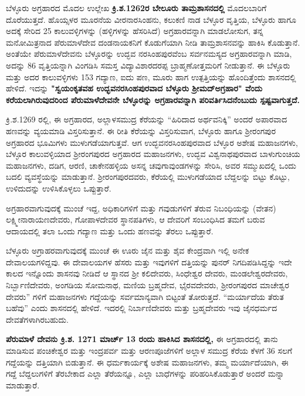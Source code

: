 ಬೆಳ್ಳೂರು ಅಗ್ರಹಾರದ ಮೊದಲ ಉಲ್ಲೇಖ \textbf{ಕ್ರಿ.ಶ.1262ರ ಬೇಲೂರು ತಾಮ್ರಶಾಸನದಲ್ಲಿ} ಮೊದಲಬಾರಿಗೆ ದೊರೆಯುತ್ತದೆ. ಹೊಯ್ಸಳರ ಮೂರನೆಯ ವೀರನಾರಸಿಂಹನು, ಕಲುಕಣಿ ನಾಡ ಬೆಳ್ಳೂರ ವೃತ್ತಿಯ, ಬೆಳ್ಳೂರು ಹಾಗೂ ಅದಕ್ಕೆ ಸೇರಿದ 25 ಕಾಲುವಳ್ಳಿಗಳನ್ನು (ಹಳ್ಳಿಗಳನ್ನು ಹೆಸರಿಸಿದೆ) ಅಗ್ರಹಾರವನ್ನಾಗಿ ಮಾಡಲೋಸುಗ, ತನ್ನ ಮನೋಮಿತ್ರನಾದ ಪೆರುಮಾಳೆದೇವ ದಂಡನಾಯಕನಿಗೆ ಕೊಡುಗೆಯಾಗಿ ನೀಡಿ ತಾಮ್ರಶಾಸನವನ್ನು ಹಾಕಿಸಿ ಕೊಡುತ್ತಾನೆ. ಅಂತೆಯೇ ಪೆರುಮಾಳೆದೇವನು ಬೆಳ್ಳೂರನ್ನು ಉದ್ಭವ ನರಸಿಂಹಪುರವೆಂಬ ಸರ್ವನಮಸ್ಯದ ಅಗ್ರಹಾರವನ್ನಾಗಿ ಮಾಡಿ, ಅದನ್ನು 86 ವೃತ್ತಿಯನ್ನಾಗಿ ವಿಂಗಡಿಸಿ ಸಮಸ್ತ ವಿದ್ಯಾವಿಶಾರದರಪ್ಪ ಬ್ರಾಹ್ಮಣೋತ್ತಮರಿಗೆ ನೀಡುತ್ತಾನೆ. ಈ ಬೆಳ್ಳೂರು ಮತ್ತು ಅದರ ಕಾಲುವಳ್ಳಿಗಳು 153 ಗದ್ಯಾಣ, ಐದು ಪಣ, ಮೂರು ಹಾಗ ಉತ್ಪತ್ತಿಯನ್ನು ಹೊಂದಿತ್ತೆಂದು ಶಾಸನದಲ್ಲಿ ಹೇಳಿದೆ. ಇದನ್ನು \textbf{"ಸ್ವಯಂಕೃತವಹ ಉದ್ಭವನರಸಿಂಹಪುರವಾದ ಬೆಳ್ಳೂರು ಶ‍್ರೀಮದ್​ಅಗ್ರಹಾರ" ವೆಂದು ಕರೆಯಲಾಗಿರುವುದರಿಂದ ಪೆರುಮಾಳೆದೇವನೇ ಬೆಳ್ಳೂರನ್ನು ಅಗ್ರಹಾರವನ್ನಾಗಿ ಪರಿವರ್ತಿಸಿದನೆಂಬುದು ಸ್ಪಷ್ಟವಾಗುತ್ತದೆ.}

ಕ್ರಿ.ಶ.1269 ರಲ್ಲಿ, ಈ ಅಗ್ರಹಾರದ, ಅಲ್ಲಾಳಸಮುದ್ರ ಕೆರೆಯನ್ನು “ಹಿರಿದಾದ ಅರ್ಥವನಿಕ್ಕಿ” ಅಂದರೆ ಅಪಾರವಾದ ಹಣವನ್ನು ವ್ಯಯಮಾಡಿ ವಿಸ್ತರಿಸುತ್ತಾನೆ. ಈ ರೀತಿ ಕೆರೆಯನ್ನು ವಿಸ್ತರಿಸುವಾಗ, ಬೆಳ್ಳೂರು ಹಾಗೂ ಶ‍್ರೀರಂಗಪುರ ಅಗ್ರಹಾರದ ಭೂಮಿಗಳು ಮುಳುಗಡೆಯಾಗುತ್ತವೆ. ಆಗ ಉದ್ಭವನರಸಿಂಹಪುರವಾದ ಬೆಳ್ಳೂರ ಅಶೇಷ ಮಹಾಜನಗಳು, ಬೆಳ್ಳೂರ ಕಾಲುವಳ್ಳಿಯಾದ ಶ‍್ರೀರಂಗಪುರದ ಅಗ್ರಹಾರದ ಮಹಾಜನಗಳು, ಉದ್ಭವ ವಿಶ್ವನಾಥಪುರವಾದ ಬಾಳುಗುಂಚಿಯ ಮಹಾಜನಗಳು, ದಡಿಗ, ಆರಣಿ, ಚಾಕೇನಹಳ್ಳಿಯ ಅಸನ್ನ ಚವುಗಾವುಂಡಗಳನ್ನು ಸೇರಿಸಿ, ಅವರ ಸಮ್ಮುಖದಲ್ಲಿ ಒಂದು ಬದಲಿ ವ್ಯವಸ್ಥೆಯನ್ನು ಮಾಡುತ್ತಾನೆ. ಶ‍್ರೀರಂಗಪುರದವರು, ಕೆರೆಯಲ್ಲಿ ಮುಳುಗಡೆಯಾದ ಬೆದ್ದಲನ್ನು ಬಿಟ್ಟು ಕೊಟ್ಟು, ಉಳಿದುದನ್ನು ಉಳಿಸಿಕೊಳ್ಳಲು ಒಪ್ಪುತ್ತಾರೆ.

ಅಗ್ರಹಾರವಾಗುವುದಕ್ಕೆ ಮುಂಚೆ ಇದ್ದ, ಅಧಿಕಾರಿಗಳಿಗೆ ಮತ್ತು ಗವುಡುಗಳಿಗೆ ತೆರುವ ನಿಬಂಧಿಯನ್ನು (ವೇತನ) ಲಕ್ಷ್ಮೀನಾರಾಯಣದೇವರು, ಗೋಪಾಳದೇವರ ಸ್ಥಾನಪತಿಗಳು, ಆ ದೇವರಿಗೆ ಸಂಬಂಧಿಸಿದ ತಮಗೆ ಬರುವ ಆದಾಯದಲ್ಲಿ ತಲಾ ಒಂದು ಗದ್ಯಾಣ ಮತ್ತು ಒಂದು ಹಣವನ್ನು ತೆರಲು ಒಪ್ಪುತ್ತಾರೆ.

ಬೆಳ್ಳೂರು ಅಗ್ರಾಹರವಾಗುವುದಕ್ಕೆ ಮುಂಚೆ ಈ ಊರು ಜೈನ ಮತ್ತು ಶೈವ ಕೇಂದ್ರವಾಗಿ ಇಲ್ಲಿ ಅನೇಕ ದೇವಾಲಯಗಳಿದ್ದವು. ಈ ದೇವಾಲಯಗಳ ಹೆಸರು ಮತ್ತು ಇವುಗಳಿಗೆ ದತ್ತಿಯನ್ನು ಪುನರ್​ ನಿಗದಿಪಡಿಸಿದ್ದನ್ನು ಇದೇ ಕಾಲದ ಇನ್ನೊಂದು ಶಾಸನವು ನೀಡಿದೆ ಆ ಸ್ಥಾನದ ಶ‍್ರೀ ಕಲಿದೇವರು, ಸಿಂಧೇಶ್ವರ ದೇವರು, ಮಂಡಲೇಶ್ವರದೇವರು, ನಿರ್ಬ್ಬಾಣಿದೇವರು, ಅಂಗಡಿಯ ಸೋಮನಾಥ, ಮಣಿಯ ಬ್ರಹ್ಮದೇವ, ಭೈರವದೇವರು, ಶ‍್ರೀರಂಗಪುರದ ಮಾಚೇಶ್ವರ ದೇವರು” ಗಳಿಗೆ ಮಹಾಜನಗಳು ಗದ್ದೆಯನ್ನು ಸರ್ವಮಾನ್ಯವಾಗಿ ಬಿಟ್ಟಂತೆ ತೋರುತ್ತದೆ. “ಮರ್ಯಾದೆಯ ತೆರುತ ಬಹೆವು” ಎಂದು ಶಾಸನದಲ್ಲಿ ಹೇಳಿದೆ. ಇದರಲ್ಲಿ ನಿರ್ಬಾಣಿದೇವರು ಮತ್ತು ಬ್ರಹ್ಮದೇವರು ಇವು ಜೈನಧರ್ಮದ ದೇವತೆಗಳಾಗಿರಬಹುದು.

\textbf{ಪೆರುಮಾಳೆ ದೇವನು ಕ್ರಿ.ಶ. 1271 ಮಾರ್ಚ್ 13 ರಂದು ಹಾಕಿಸಿದ ಶಾಸನದಲ್ಲಿ,} ಈ ಅಗ್ರಹಾರದಲ್ಲಿ ತಾನು ಮಾಡಿಸುವ ಪಂಚಿಕೇಶ್ವರ ಮತ್ತು ಇಂದ್ರಪರ್ವ ಮತ್ತು ಆರಣಪೂಜೆಗಳಿಗೆ ಅಲ್ಲಾಳ ಸಮುದ್ರ ಕೆರೆಯ ಕೆಳಗೆ 36 ಸಲಗೆ ಗದ್ದೆಯನ್ನು ದತ್ತಿಯಾಗಿ ಬಿಡುತ್ತಾನೆ. ಈ ಧರ್ಮಕಾರ್ಯಕ್ಕೆ ಅಶೇಷ ಮಹಾಜನಗಳು, ತಮ್ಮ ಮರ್ಯಾದೆಯಾಗಿ, ಈ ಗದ್ದೆ ಬೆದ್ದಲುಗಳಿಗೆ ತೆರಬೇಕಾದ ಎಲ್ಲಾ ತೆರೆಯನ್ನೂ, ಎಲ್ಲಾ ಬಾಧೆಗಳನ್ನು ಪರಿಹರಿಸಿಕೊಡುತ್ತಾರೆ ಅಂದರೆ ಮನ್ನಾ ಮಾಡುತ್ತಾರೆ.

